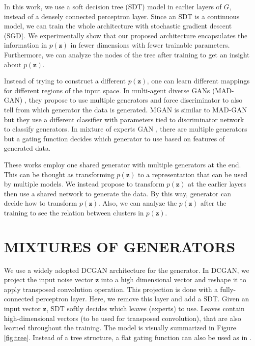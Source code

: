 \documentclass[a4paper,onesided,12pt]{report}
\begin{document}
In this work, we use a soft decision tree (SDT) model \cite{sdt} in earlier layers of $G$, instead of a densely connected perceptron layer. Since an SDT is a continuous model, we can train the whole architecture with stochastic gradient descent (SGD). We experimentally show that our proposed architecture encapsulates the information in $p(\boldsymbol{z})$ in fewer dimensions with fewer trainable parameters. Furthermore, we can analyze the nodes of the tree after training to get an insight about $p(\boldsymbol{z})$.

Instead of trying to construct a different $p(\boldsymbol{z})$, one can learn different mappings for different regions of the input space. In multi-agent diverse GANs (MAD-GAN) \cite{madgan}, they propose to use multiple generators and force discriminator to also tell from which generator the data is generated.  MGAN \cite{mgan} is similar to MAD-GAN but they use a different classifier with parameters tied to discriminator network to classify generators. In mixture of experts GAN \cite{megan}, there are multiple generators but a gating function decides which generator to use based on features of generated data.

These works employ one shared generator with multiple generators at the end. This can be thought as transforming $p(\boldsymbol{z})$ to a representation that can be used by multiple models. We instead propose to transform $p(\boldsymbol{z})$ at the earlier layers then use a shared network to generate the data. By this way, generator can decide how to transform $p(\boldsymbol{z})$. Also, we can analyze the $p(\boldsymbol{z})$ after the training to see the relation between clusters in $p(\boldsymbol{z})$.

\chapter{MIXTURES OF GENERATORS}
\label{chapter:me}

\lipsum[5]

We use a widely adopted DCGAN \cite{dcgan} architecture for the generator. In DCGAN, we project the input noise vector $\boldsymbol{z}$ into a high dimensional vector and reshape it to apply transposed convolution operation. This projection is done with a fully-connected perceptron layer. Here, we remove this layer and add a SDT. Given an input vector $\boldsymbol{z}$, SDT softly decides which leaves (experts) to use. Leaves contain high-dimensional vectors (to be used for transposed convolution), that are also learned throughout the training. The model is visually summarized in Figure \ref{fig:tree}. Instead of a tree structure, a flat gating function can also be used as in \cite{me}.
\end{document}

